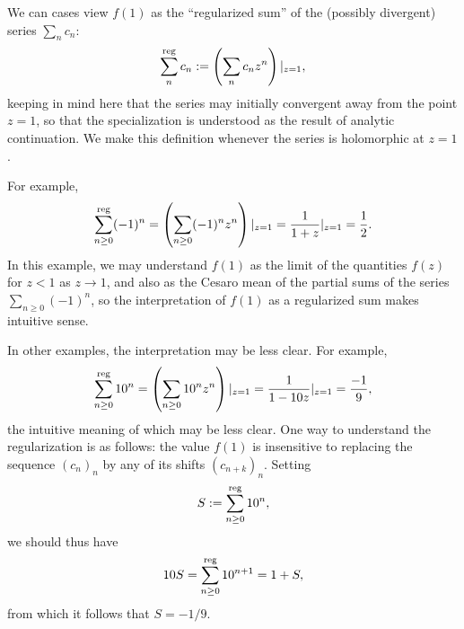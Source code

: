 \documentclass[reqno]{amsart} 
\begin{document}
\begin{remark}
  We can cases view $f(1)$ as the ``regularized sum'' of the (possibly divergent) series $\sum_n c_n$:
  \begin{equation*}
    \sum_{n}^{\operatorname{reg}} c_n := \left( \sum_n c_n z^n \right)|_{z=1}, 
  \end{equation*}
  keeping in mind here that the series may initially convergent away from the point $z=1$, so that the specialization is understood as the result of analytic continuation.  We make this definition whenever the series is holomorphic at $z=1$.

  For example,
  \begin{equation*}
    \sum_{n \geq 0}^{\operatorname{reg}} (-1)^n
    =
    \left( \sum_{n \geq 0} (-1)^n z^n \right)|_{z=1}
    = \frac{1}{1 + z} \vert_{z=1} = \frac{1}{2}.
  \end{equation*}
  In this example, we may understand $f(1)$ as the limit of the quantities $f(z)$ for $z < 1$ as $z \rightarrow 1$, and also as the Cesaro mean of the partial sums of the series $\sum_{n \geq 0} (-1)^n$, so the interpretation of $f(1)$ as a regularized sum makes intuitive sense.

  In other examples, the interpretation may be less clear.  For example,
  \begin{equation*}
    \sum_{n \geq 0}^{\operatorname{reg}} 10^n =
    \left( \sum_{n \geq 0} 10^n z^n \right)|_{z=1}
    =
    \frac{1}{1 - 10 z} \vert_{z=1} =
    \frac{-1}{9},
  \end{equation*}
  the intuitive meaning of which may be less clear.  One way to understand the regularization is as follows: the value $f(1)$ is insensitive to replacing the sequence $(c_n)_n$ by any of its shifts $(c_{n+k})_n$.  Setting
  \begin{equation*}
    S := \sum_{n \geq 0}^{\operatorname{reg}} 10^n,
  \end{equation*}
  we should thus have
  \begin{equation*}
    10 S = \sum_{n \geq 0}^{\operatorname{reg}} 10^{n+1}
    = 1 + S,
  \end{equation*}
  from which it follows that $S = -1/9$.
\end{remark}
\end{document}
